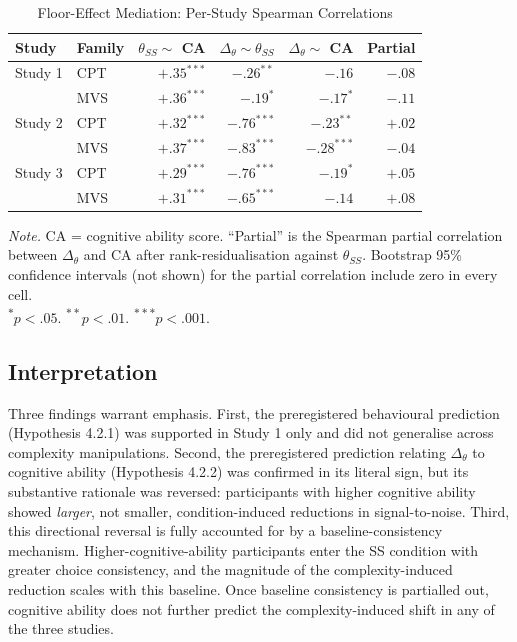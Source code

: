 \documentclass[man,floatsintext]{apa7}
\begin{document}
\begin{table}[!htbp]
\centering
\begin{threeparttable}
\caption{Floor-Effect Mediation: Per-Study Spearman Correlations}
\label{tab:floor_effect}
\begin{tabular}{llrrrr}
\toprule
\textbf{Study} & \textbf{Family} & $\theta_{SS} \sim$ CA & $\Delta_\theta \sim \theta_{SS}$ & $\Delta_\theta \sim$ CA & Partial \\
\midrule
Study 1 & CPT & $+.35^{***}$ & $-.26^{**}$  & $-.16$       & $-.08$ \\
        & MVS & $+.36^{***}$ & $-.19^{*}$   & $-.17^{*}$   & $-.11$ \\
Study 2 & CPT & $+.32^{***}$ & $-.76^{***}$ & $-.23^{**}$  & $+.02$ \\
        & MVS & $+.37^{***}$ & $-.83^{***}$ & $-.28^{***}$ & $-.04$ \\
Study 3 & CPT & $+.29^{***}$ & $-.76^{***}$ & $-.19^{*}$   & $+.05$ \\
        & MVS & $+.31^{***}$ & $-.65^{***}$ & $-.14$       & $+.08$ \\
\bottomrule
\end{tabular}
\begin{tablenotes}[flushleft]
\small
\item \textit{Note.} CA = cognitive ability score. ``Partial'' is the Spearman partial correlation between $\Delta_\theta$ and CA after rank-residualisation against $\theta_{SS}$. Bootstrap 95\% confidence intervals (not shown) for the partial correlation include zero in every cell. \\
\textsuperscript{$*$}$p < .05$. \textsuperscript{$**$}$p < .01$. \textsuperscript{$***$}$p < .001$.
\end{tablenotes}
\end{threeparttable}
\end{table}

\subsection{Interpretation}

Three findings warrant emphasis. First, the preregistered behavioural prediction (Hypothesis 4.2.1) was supported in Study 1 only and did not generalise across complexity manipulations. Second, the preregistered prediction relating $\Delta_\theta$ to cognitive ability (Hypothesis 4.2.2) was confirmed in its literal sign, but its substantive rationale was reversed: participants with higher cognitive ability showed \textit{larger}, not smaller, condition-induced reductions in signal-to-noise. Third, this directional reversal is fully accounted for by a baseline-consistency mechanism. Higher-cognitive-ability participants enter the SS condition with greater choice consistency, and the magnitude of the complexity-induced reduction scales with this baseline. Once baseline consistency is partialled out, cognitive ability does not further predict the complexity-induced shift in any of the three studies.
\end{document}
